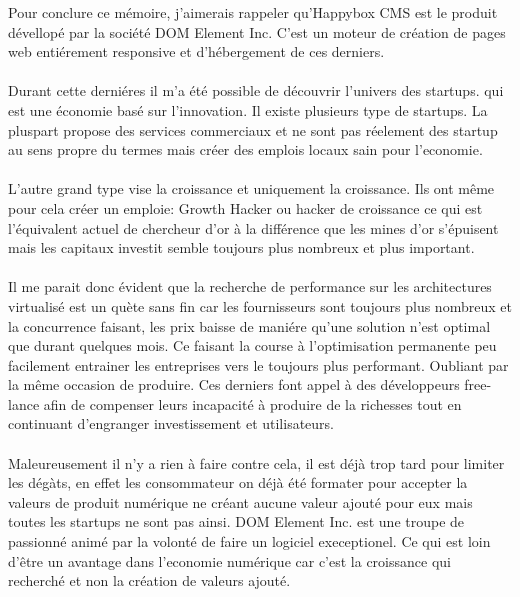 \documentclass[11pt, a4paper ]{article}
\begin{document}
\begin{spacing}{1.5}



Pour conclure ce mémoire, j'aimerais rappeler qu'Happybox CMS est le produit dévellopé par la société DOM Element Inc. C'est un moteur de création de pages web entiérement responsive et d'hébergement de ces derniers.
\paragraph{}
Durant cette derniéres il m'a été possible de découvrir l'univers des startups. qui est une économie basé sur l'innovation. Il existe plusieurs type de startups. La pluspart propose des services commerciaux et ne sont pas réelement des startup au sens propre du termes mais créer des emplois locaux sain pour l'economie.
\paragraph{}
L'autre grand type vise la croissance et uniquement la croissance. Ils ont même pour cela créer un emploie: Growth Hacker ou hacker de croissance ce qui est l'équivalent actuel de chercheur d'or à la différence que les mines d'or s'épuisent mais les capitaux investit semble toujours plus nombreux et plus important.

\paragraph{}
Il me parait donc évident que la recherche de performance sur les architectures virtualisé est un quète sans fin car les fournisseurs sont toujours plus nombreux et la concurrence faisant, les prix baisse de maniére qu'une solution n'est optimal que durant quelques mois. Ce faisant la course à l'optimisation permanente peu facilement entrainer les entreprises vers le toujours plus performant. Oubliant par la même occasion de produire. Ces derniers font appel à des développeurs free-lance afin de compenser leurs incapacité à produire de la richesses tout en continuant d'engranger investissement et utilisateurs.

\paragraph{}
Maleureusement il n'y a rien à faire contre cela, il est déjà trop tard pour limiter les dégàts, en effet les consommateur on déjà été formater pour accepter la valeurs de produit numérique ne créant aucune valeur ajouté pour eux mais toutes les startups ne sont pas ainsi. DOM Element Inc. est une troupe de passionné animé par la volonté de faire un logiciel execeptionel. Ce qui est loin d'être un avantage dans l'economie numérique car c'est la croissance qui recherché et non la création de valeurs ajouté.


\end{spacing}
\end{document}

